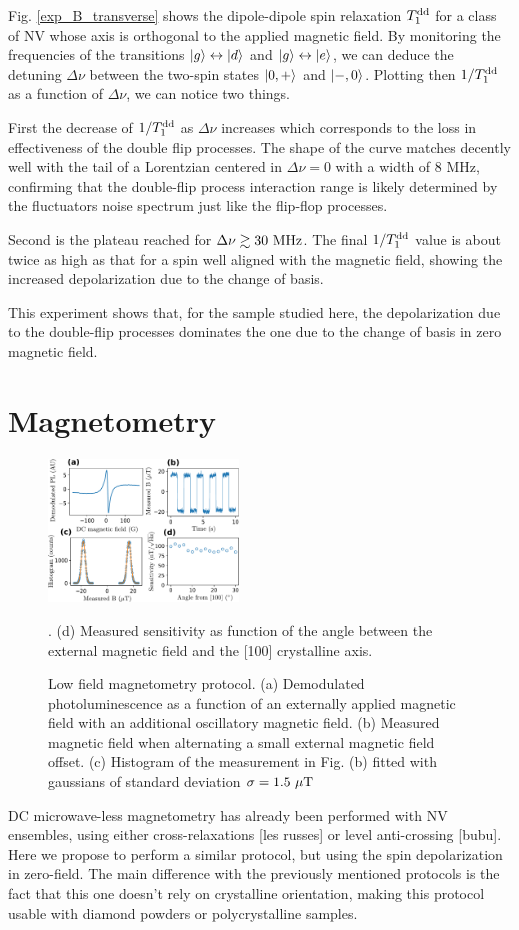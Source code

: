 \documentclass[preprintnumbers,amsmath,amssymb,superscriptaddress,twocolumn,showpacs]{revtex4-2}
\begin{document}
Fig. \ref{exp_B_transverse} shows the dipole-dipole spin relaxation $T_1^{\rm dd}$ for a class of NV whose axis is orthogonal to the applied magnetic field. By monitoring the frequencies of the transitions $\ket{g} \leftrightarrow \ket{d}$ and $\ket{g} \leftrightarrow \ket{e}$, we can deduce the detuning $\Delta \nu$ between the two-spin states $\ket{0,+}$ and $\ket{-,0}$. Plotting then $1/T_1^{\rm dd}$ as a function of $\Delta \nu$, we can notice two things. 

First the decrease of $1/T_1^{\rm dd}$ as $\Delta \nu$ increases which corresponds to the loss in effectiveness of the double flip processes. The shape of the curve matches decently well with the tail of a Lorentzian centered in $\Delta \nu=0$ with a width of 8 MHz, confirming that the double-flip process interaction range is likely determined by the fluctuators noise spectrum just like the flip-flop processes. 

Second is the plateau reached for $\Delta \nu \gtrsim 30\ \rm MHz$. The final $1/T_1^{\rm dd}$ value is about twice as high as that for a spin well aligned with the magnetic field, showing the increased depolarization due to the change of basis.

This experiment shows that, for the sample studied here, the depolarization due to the double-flip processes dominates the one due to the change of basis in zero magnetic field.

\section*{Magnetometry}
\begin{figure}
\includegraphics[width=0.45\textwidth]{Figures/fig_magneto}
\caption{Low field magnetometry protocol. (a) Demodulated photoluminescence as a function of an externally applied magnetic field with an additional oscillatory magnetic field. (b) Measured magnetic field when alternating a small external magnetic field offset. (c) Histogram of the measurement in Fig. (b) fitted with gaussians of standard deviation $\sigma=1.5\ \mu \rm T$}. (d) Measured sensitivity as function of the angle between the external magnetic field and the [100] crystalline axis.
\label{magneto}
\end{figure}
DC microwave-less magnetometry has already been performed with NV ensembles, using either cross-relaxations [les russes] or level anti-crossing [bubu]. Here we propose to perform a similar protocol, but using the spin depolarization in zero-field. The main difference with the previously mentioned protocols is the fact that this one doesn't rely on crystalline orientation, making this protocol usable with diamond powders or polycrystalline samples.
\end{document}
